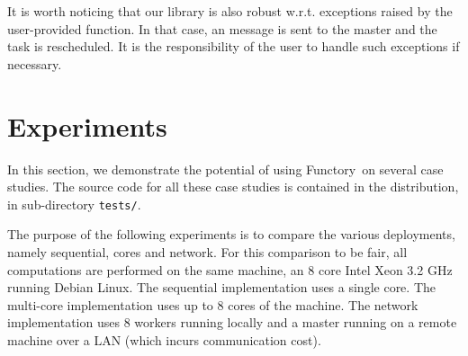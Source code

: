 \documentclass{llncs}
\newcommand{\functory}{\textsf{Functory}}
\begin{document}
It is worth noticing that our library is also robust w.r.t. exceptions
raised by the user-provided  function. In that case, an
 message is sent to the master and the task is
rescheduled. It is the responsibility of the user to handle such
exceptions if necessary.


\section{Experiments}\label{sec:experiments}

In this section, we demonstrate the potential of using \functory\ on
several case studies.
The source code for all these case studies is contained in the
distribution, in sub-directory \texttt{tests/}.

The purpose of the following experiments is to compare the various
deployments, namely sequential, cores and network.
For this comparison to be fair, all
computations are performed on the same machine, an 8 core Intel Xeon
3.2 GHz running Debian Linux. The sequential implementation uses a
single core. The multi-core implementation uses up to 8 cores of
the machine. The network implementation uses 8 workers running locally and
a master running on a remote machine over a LAN 
(which incurs communication cost).
\end{document}
